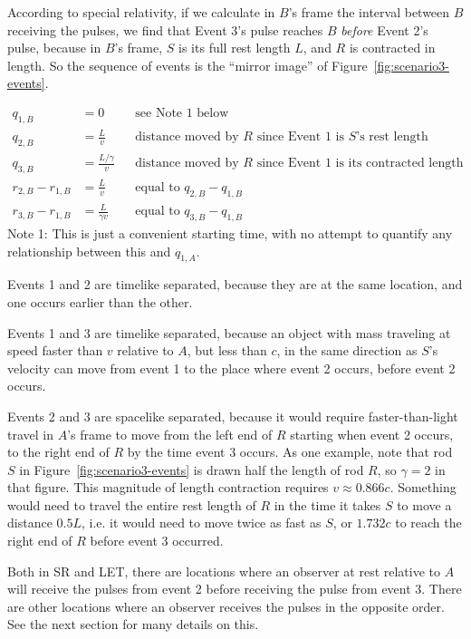 \documentclass[a4paper]{article}
\theoremstyle{plain}
\theoremstyle{definition}
\begin{document}
According to special relativity, if we calculate in $B$'s frame the
interval between $B$ receiving the pulses, we find that Event 3's
pulse reaches $B$ {\em before} Event 2's pulse, because in $B$'s frame, $S$
is its full rest length $L$, and $R$ is contracted in length.  So the
sequence of events is the ``mirror image'' of
Figure~\ref{fig:scenario3-events}.

\begin{align*}
q_{1,B} & = 0 & & \text{see Note 1 below}\\
q_{2,B} & = \frac{L}{v} & & \text{distance moved by $R$ since Event 1 is $S$'s rest length} \\
q_{3,B} & = \frac{L/\gamma}{v} & & \text{distance moved by $R$ since Event 1 is its contracted length} \\
r_{2,B} - r_{1,B} & = \frac{L}{v} & & \text{equal to $q_{2,B} - q_{1,B}$} \\
r_{3,B} - r_{1,B} & = \frac{L}{\gamma v} & & \text{equal to $q_{3,B} - q_{1,B}$}
\end{align*}
Note 1: This is just a convenient starting time, with no attempt to
quantify any relationship between this and $q_{1,A}$.

Events 1 and 2 are timelike separated, because they are at the same
location, and one occurs earlier than the other.

Events 1 and 3 are timelike separated, because an object with mass
traveling at speed faster than $v$ relative to $A$, but less than $c$,
in the same direction as $S$'s velocity can move from event 1 to the
place where event 2 occurs, before event 2 occurs.

Events 2 and 3 are spacelike separated, because it would require
faster-than-light travel in $A$'s frame to move from the left end of
$R$ starting when event 2 occurs, to the right end of $R$ by the time
event 3 occurs.  As one example, note that rod $S$ in
Figure~\ref{fig:scenario3-events} is drawn half the length of rod $R$,
so $\gamma=2$ in that figure.  This magnitude of length contraction
requires $v \approx 0.866c$.  Something would need to travel the
entire rest length of $R$ in the time it takes $S$ to move a distance
$0.5L$, i.e. it would need to move twice as fast as $S$, or $1.732c$
to reach the right end of $R$ before event 3 occurred.

Both in SR and LET, there are locations where an observer at rest
relative to $A$ will receive the pulses from event 2 before receiving
the pulse from event 3.  There are other locations where an observer
receives the pulses in the opposite order.  See the next section for
many details on this.
\end{document}
